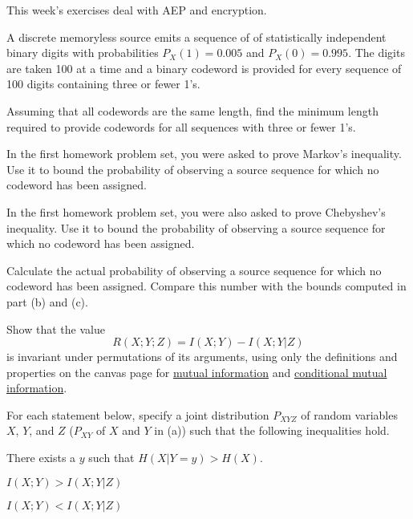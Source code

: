 \documentclass[a4paper,10pt,landscape,twocolumn]{scrartcl}
\begin{document}
\practiceproblems

{\sffamily\noindent
This week's exercises deal with AEP and encryption.  \practiceinstructions
}

\begin{exercise}
A discrete memoryless source emits a sequence of of statistically independent binary digits with probabilities $P_X(1) = 0.005$ and $P_X(0) = 0.995$. The digits are taken 100 at a time and a binary codeword is provided for every sequence of 100 digits containing three or fewer 1's.
	\begin{subex}
	Assuming that all codewords are the same length, find the minimum length required to
provide codewords for all sequences with three or fewer 1's.
	\end{subex}
	\begin{subex}
		In the first homework problem set, you were asked to prove Markov's inequality.
		Use it to bound the probability of observing a source sequence for
		which no codeword has been assigned.
	\end{subex}
    \begin{subex}
    	In the first homework problem set, you were also asked to
        prove Chebyshev's inequality. Use it to bound the probability of observing a source sequence for
		which no codeword has been assigned.
	\begin{subex}
	Calculate the actual probability of observing a source sequence for which no codeword has
been assigned. Compare this number with the bounds computed
in part (b) and (c).
	\end{subex}
	\end{subex}
\end{exercise}



\begin{exercise}
Show that the value
\[
R(X;Y;Z) = I(X;Y) - I(X;Y|Z)
\]
is invariant under permutations of its arguments, using only the definitions and properties on the canvas page for \href{https://canvas.uva.nl/courses/2205/pages/definition-mutual-information?module_item_id=17286}{mutual information} and \href{https://canvas.uva.nl/courses/2205/pages/definition-conditional-mutual-information?module_item_id=26474}{conditional mutual information}.
\end{exercise}

\begin{exercise}
For each statement below, specify a joint distribution $P_{XYZ}$ of random variables $X$, $Y$, and $Z$ ($P_{XY}$ of $X$ and $Y$ in (a)) such that the following inequalities hold.
\begin{subex}
There exists a $y$ such that $H(X|Y=y) > H(X)$.
\end{subex}
\begin{subex}
$I(X;Y) > I(X;Y|Z)$
\end{subex}
\begin{subex}
$I(X;Y) < I(X;Y|Z)$
\end{subex}
\end{exercise}
\end{document}
